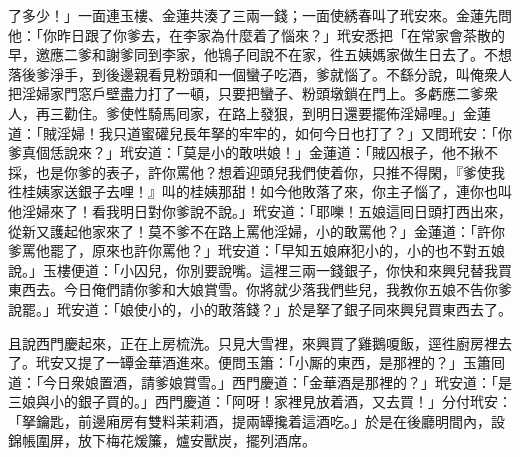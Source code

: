 了多少！」一面連玉樓、金蓮共湊了三兩一錢；一面使綉春叫了玳安來。金蓮先問他：「你昨日跟了你爹去，在李家為什麼着了惱來？」{}玳安悉把「在常家會茶散的早，邀應二爹和謝爹同到李家，他鴇子囘說不在家，徃五姨媽家做生日去了。不想落後爹淨手，到後邊親看見粉頭和一個蠻子吃酒，爹就惱了。不繇分說，叫俺衆人把淫婦家門窓戶壁盡力打了一頓，只要把蠻子、粉頭墩鎖在門上。多虧應二爹衆人，再三勸住。爹使性騎馬囘家，在路上發狠，到明日還要擺佈淫婦哩。」金蓮道：「賊淫婦！我只道蜜礶兒長年拏的牢牢的，如何今日也打了？」又問玳安：「你爹真個恁說來？」{}玳安道：「莫是小的敢哄娘！」金蓮道：「賊囚根子，他不揪不採，也是你爹的表子，許你罵他？{}想着迎頭兒我們使着你，只推不得閑，『爹使我徃桂姨家送銀子去哩！』叫的桂姨那甜！如今他敗落了來，你主子惱了，連你也叫他淫婦來了！看我明日對你爹說不說。」玳安道：「耶嚛！五娘這囘日頭打西出來，從新又護起他家來了！莫不爹不在路上罵他淫婦，小的敢罵他？」金蓮道：「許你爹罵他罷了，原來也許你罵他？」玳安道：「早知五娘麻犯小的，小的也不對五娘說。」玉樓便道：「小囚兒，你別要說嘴。{}這裡三兩一錢銀子，你快和來興兒替我買東西去。今日俺們請你爹和大娘賞雪。你將就少落我們些兒，我教你五娘不告你爹說罷。」玳安道：「娘使小的，小的敢落錢？」於是拏了銀子同來興兒買東西去了。

且說西門慶起來，正在上房梳洗。只見大雪裡，來興買了雞鵝嗄飯，逕徃廚房裡去了。玳安又提了一罈金華酒進來。便問玉簫：「小厮的東西，是那裡的？」玉簫囘道：「今日衆娘置酒，請爹娘賞雪。」西門慶道：「金華酒是那裡的？」玳安道：「是三娘與小的銀子買的。」西門慶道：「阿呀！家裡見放着酒，又去買！」分付玳安：「拏鑰匙，前邊廂房有雙料茉莉酒，提兩罈攙着這酒吃。」於是在後廳明間內，設錦帳圍屏，放下梅花煖簾，爐安獸炭，擺列酒席。

